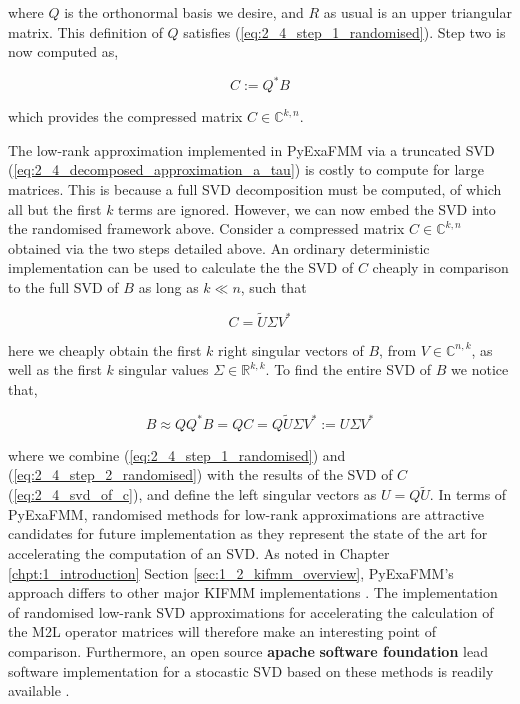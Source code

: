 where $Q$ is the orthonormal basis we desire, and $R$ as usual is an upper triangular
matrix. This definition of $Q$ satisfies (\ref{eq:2_4_step_1_randomised}). Step two
is now computed as,

\begin{equation}
    C := Q^* B
    \label{eq:2_4_step_2_randomised}
\end{equation}

which provides the compressed matrix $C \in \mathbb{C}^{k, n}$.

The low-rank approximation implemented in \gls{PyExaFMM} via a truncated
\gls{SVD} (\ref{eq:2_4_decomposed_approximation_a_tau}) is costly to compute
for large matrices. This is because a full \gls{SVD} decomposition must be computed, of
which all but the first $k$ terms are ignored. However, we can now embed the
\gls{SVD} into the randomised framework above. Consider a compressed matrix
$C \in \mathbb{C}^{k, n}$ obtained via the two steps detailed above. An
ordinary deterministic implementation can be used to calculate the
the \gls{SVD} of $C$ cheaply in comparison to the full SVD of $B$ as long as
$k \ll n$, such that

\begin{equation}
    C = \tilde{U}\Sigma V^*
    \label{eq:2_4_svd_of_c}
\end{equation}

here we cheaply obtain the first $k$ right singular vectors of $B$,
from $V \in \mathbb{C}^{n, k}$, as well as the first $k$ singular values
$\Sigma \in \mathbb{R}^{k, k}$. To find the entire \gls{SVD} of $B$ we notice
that,

\begin{equation}
    B \approx Q Q^* B = QC = Q \tilde{U} \Sigma V^* := U\Sigma V^*
\end{equation}

where we combine (\ref{eq:2_4_step_1_randomised}) and (\ref{eq:2_4_step_2_randomised})
with the results of the \gls{SVD} of $C$ (\ref{eq:2_4_svd_of_c}), and define the
left singular vectors as $U = Q \tilde{U}$. In terms of \gls{PyExaFMM}, randomised
methods for low-rank approximations are attractive candidates for future implementation
as they represent the state of the art for accelerating the computation of an \gls{SVD}.
As noted in Chapter \ref{chpt:1_introduction} Section \ref{sec:1_2_kifmm_overview},
\gls{PyExaFMM}'s approach differs to other major \gls{KIFMM} implementations \cite{Malhotra:2015:CCP,exafmm}.
The implementation of randomised low-rank SVD approximations for accelerating the calculation of the \gls{M2L}
operator matrices will therefore make an interesting point of comparison. Furthermore,
an open source \textbf{\gls{apache}} \textbf{software foundation} lead software implementation for
a stocastic \gls{SVD} based on these methods is readily available \cite{mahout}.
